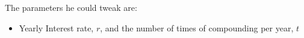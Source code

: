 \documentclass[preview]{standalone}
\begin{document}
\begin{center}
The parameters he could tweak are: \\ \begin{itemize} \item Yearly Interest rate, $r$, and the number of times of compounding per year, $t$  \end{itemize}
\end{center}
\end{document}

